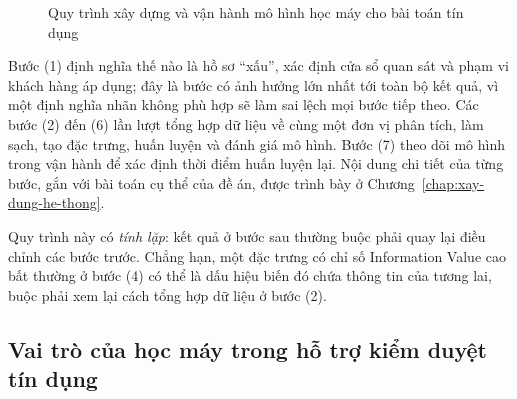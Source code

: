\begin{figure}[htbp]
\caption{Quy trình xây dựng và vận hành mô hình học máy cho bài toán tín dụng}
\label{fig:ml-pipeline}
\end{figure}

Bước (1) định nghĩa thế nào là hồ sơ ``xấu'', xác định cửa sổ quan sát và phạm vi
khách hàng áp dụng; đây là bước có ảnh hưởng lớn nhất tới toàn bộ kết quả, vì một
định nghĩa nhãn không phù hợp sẽ làm sai lệch mọi bước tiếp theo. Các bước (2)
đến (6) lần lượt tổng hợp dữ liệu về cùng một đơn vị phân tích, làm sạch, tạo đặc
trưng, huấn luyện và đánh giá mô hình. Bước (7) theo dõi mô hình trong vận hành để
xác định thời điểm huấn luyện lại. Nội dung chi tiết của từng bước, gắn với bài
toán cụ thể của đề án, được trình bày ở Chương~\ref{chap:xay-dung-he-thong}.

Quy trình này có \textit{tính lặp}: kết quả ở bước sau thường buộc phải quay lại
điều chỉnh các bước trước. Chẳng hạn, một đặc trưng có chỉ số Information Value
cao bất thường ở bước (4) có thể là dấu hiệu biến đó chứa thông tin của tương
lai, buộc phải xem lại cách tổng hợp dữ liệu ở bước (2).

\subsection{Vai trò của học máy trong hỗ trợ kiểm duyệt tín dụng}
\label{subsec:vai-tro-hoc-may}


